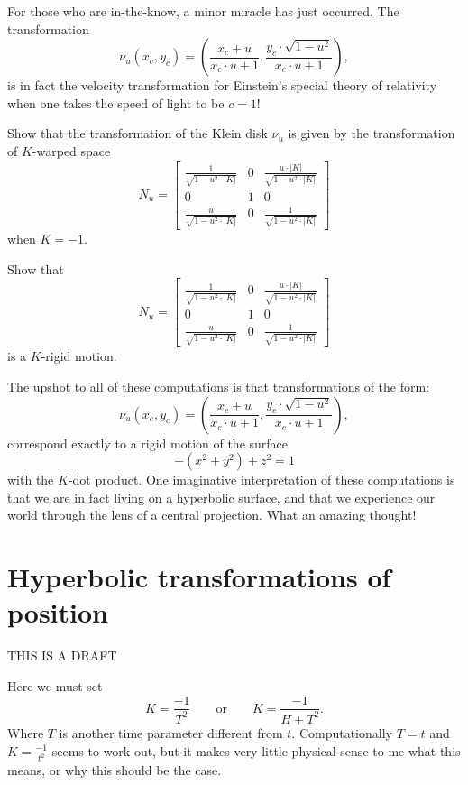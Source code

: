 \documentclass{ximera}
\begin{document}
For those who are in-the-know, a minor miracle has just occurred. The transformation
\[
  \nu_u(x_c,y_c) = \left(\frac{x_c + u}{x_c\cdot u + 1},\frac{y_c\cdot \sqrt{1-u^2}}{x_c\cdot u+1}\right),
\]
is in fact the velocity transformation for Einstein's special theory
of relativity when one takes the speed of light to be $c=1$!

\begin{problem}
Show that the transformation of the Klein disk $\nu_u$ is
given by the transformation of $K$-warped space
\[
N_u = 
\begin{bmatrix}
  \frac{1}{\sqrt{1-u^2\cdot|K|}} & 0 & \frac{u\cdot|K|}{\sqrt{1-u^2\cdot|K|}}\\
  0 & 1 & 0\\
  \frac{u}{\sqrt{1-u^2\cdot|K|}} & 0 & \frac{1}{\sqrt{1-u^2\cdot|K|}}
\end{bmatrix}
\]
when $K=-1$.
\end{problem}

\begin{problem}
  Show that
  \[
  N_u = 
  \begin{bmatrix}
    \frac{1}{\sqrt{1-u^2\cdot|K|}} & 0 & \frac{u\cdot|K|}{\sqrt{1-u^2\cdot|K|}}\\
    0 & 1 & 0\\
    \frac{u}{\sqrt{1-u^2\cdot|K|}} & 0 & \frac{1}{\sqrt{1-u^2\cdot|K|}}
  \end{bmatrix}
  \]
  is a $K$-rigid motion.
\end{problem}

The upshot to all of these computations is that transformations of the form:
\[
\nu_u(x_c,y_c) = \left(\frac{x_c + u}{x_c\cdot u + 1},\frac{y_c\cdot \sqrt{1-u^2}}{x_c\cdot u+1}\right),
\]
correspond exactly to a rigid motion of the surface
\[
-(x^2+y^2) + z^2 =1
\]
with the $K$-dot product. One imaginative interpretation of these
computations is that we are in fact living on a hyperbolic surface,
and that we experience our world through the lens of a central
projection. What an amazing thought!


\section{Hyperbolic transformations of position}


THIS IS A DRAFT


Here we must set
\[
K = \frac{-1}{T^2}\qquad \text{or}\qquad K = \frac{-1}{H+T^2}.
\]
Where $T$ is another time parameter different from $t$.
Computationally $T=t$ and $K= \frac{-1}{t^2}$ seems to work out, but
it makes very little physical sense to me what this means, or why this
should be the case.
\end{document}
